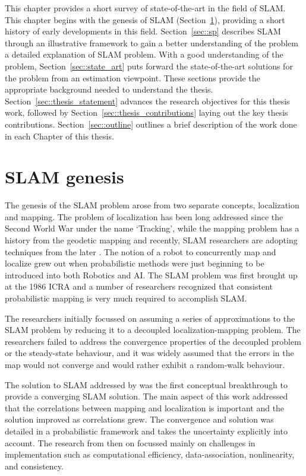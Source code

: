 This chapter provides a short survey of state-of-the-art in the field of SLAM. This chapter begins with the genesis of SLAM (Section~\ref{sec::bg}), providing a short history of early developments in this field. Section~\ref{sec::sp} describes SLAM through an illustrative framework to gain a better understanding of the problem a detailed explanation of SLAM problem. With a good understanding of the problem, Section~\ref{sec::state_art} puts forward the state-of-the-art solutions for the problem from an estimation viewpoint. These sections provide the appropriate background needed to understand the thesis. Section~\ref{sec::thesis_statement} advances the research objectives for this thesis work, followed by Section~\ref{sec::thesis_contributions} laying out the key thesis contributions. Section~\ref{sec::outline} outlines a brief description of the work done in each Chapter of this thesis.

\section{SLAM genesis} \label{sec::bg}
The genesis of the \acs{SLAM} problem arose from two separate concepts, localization and mapping. The problem of localization has been long addressed since the Second World War under the name `Tracking', while the mapping problem has a history from the geodetic mapping and recently, \acs{SLAM} researchers are adopting techniques from the later \cite{agarwalsurvey}. The notion of a robot to concurrently map and localize grew out when probabilistic methods were just beginning to be introduced into both Robotics and \acf{AI}. The \acs{SLAM} problem was first brought up at the 1986 \acf{ICRA} and a number of researchers recognized that consistent probabilistic mapping is very much required to accomplish SLAM.

The researchers initially focussed on assuming a series of approximations to the \acs{SLAM} problem by reducing it to a decoupled localization-mapping problem. The researchers failed to address the convergence properties of the decoupled problem or the steady-state behaviour, and it was widely assumed that the errors in the map would not converge and would rather exhibit a random-walk behaviour.

The solution to SLAM addressed by \cite{dissanayake2001solution} was the first conceptual breakthrough to provide a converging SLAM solution. The main aspect of this work addressed that the correlations between mapping and localization is important and the solution improved as correlations grew. The convergence and solution was detailed in a probabilistic framework and takes the uncertainty explicitly into account. The research from then on focussed mainly on challenges in implementation such as computational efficiency, data-association, nonlinearity, and consistency.

